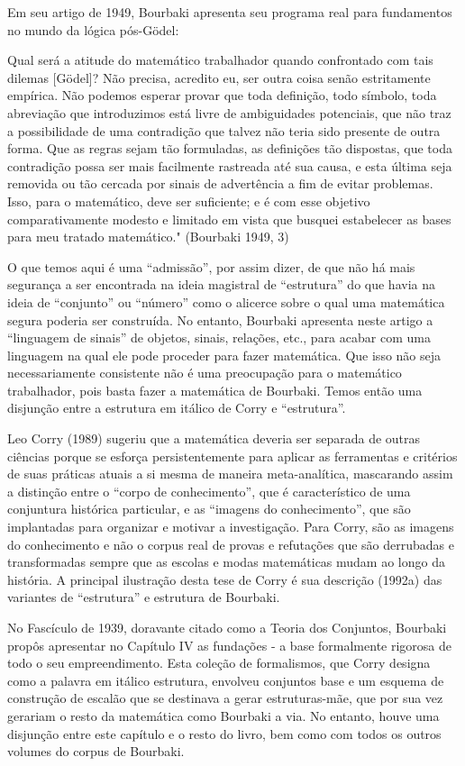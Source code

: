 \documentclass[12pt]{article}
\begin{document}
Em seu artigo de 1949, Bourbaki apresenta seu programa real para fundamentos no mundo da lógica pós-Gödel:

Qual será a atitude do matemático trabalhador quando confrontado com tais dilemas [Gödel]? Não precisa, acredito eu, ser outra coisa senão estritamente empírica. Não podemos esperar provar que toda definição, todo símbolo, toda abreviação que introduzimos está livre de ambiguidades potenciais, que não traz a possibilidade de uma contradição que talvez não teria sido presente de outra forma. Que as regras sejam tão formuladas, as definições tão dispostas, que toda contradição possa ser mais facilmente rastreada até sua causa, e esta última seja removida ou tão cercada por sinais de advertência a fim de evitar problemas. Isso, para o matemático, deve ser suficiente; e é com esse objetivo comparativamente modesto e limitado em vista que busquei estabelecer as bases para meu tratado matemático." (Bourbaki 1949, 3)

O que temos aqui é uma “admissão”, por assim dizer, de que não há mais segurança a ser encontrada na ideia magistral de “estrutura” do que havia na ideia de “conjunto” ou “número” como o alicerce sobre o qual uma matemática segura poderia ser construída. No entanto, Bourbaki apresenta neste artigo a “linguagem de sinais” de objetos, sinais, relações, etc., para acabar com uma linguagem na qual ele pode proceder para fazer matemática. Que isso não seja necessariamente consistente não é uma preocupação para o matemático trabalhador, pois basta fazer a matemática de Bourbaki. Temos então uma disjunção entre a estrutura em itálico de Corry e “estrutura”.

Leo Corry (1989) sugeriu que a matemática deveria ser separada de outras ciências porque se esforça persistentemente para aplicar as ferramentas e critérios de suas práticas atuais a si mesma de maneira meta-analítica, mascarando assim a distinção entre o “corpo de conhecimento”, que é característico de uma conjuntura histórica particular, e as “imagens do conhecimento”, que são implantadas para organizar e motivar a investigação. Para Corry, são as imagens do conhecimento e não o corpus real de provas e refutações que são derrubadas e transformadas sempre que as escolas e modas matemáticas mudam ao longo da história. A principal ilustração desta tese de Corry é sua descrição (1992a) das variantes de “estrutura” e estrutura de Bourbaki.

No Fascículo de 1939, doravante citado como a Teoria dos Conjuntos, Bourbaki propôs apresentar no Capítulo IV as fundações - a base formalmente rigorosa de todo o seu empreendimento. Esta coleção de formalismos, que Corry designa como a palavra em itálico estrutura, envolveu conjuntos base e um esquema de construção de escalão que se destinava a gerar estruturas-mãe, que por sua vez gerariam o resto da matemática como Bourbaki a via. No entanto, houve uma disjunção entre este capítulo e o resto do livro, bem como com todos os outros volumes do corpus de Bourbaki.
\end{document}
